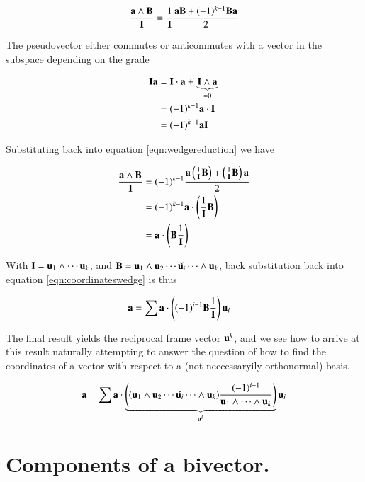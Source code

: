 \documentclass{article}      %
\begin{document}
\begin{equation}\label{eqn:wedgereduction}
\frac{\mathbf{a} \wedge \mathbf{B}}{\mathbf{I}} = \frac{1}{\mathbf{I}} \frac{\mathbf{a}\mathbf{B} + (-1)^{k-1}\mathbf{B}\mathbf{a}}{2}
\end{equation}

The pseudovector either commutes or anticommutes with a vector in the subspace depending on the grade

\begin{align*}
\mathbf{I} \mathbf{a} 
&= \mathbf{I} \cdot \mathbf{a} + \underbrace{\mathbf{I} \wedge \mathbf{a}}_{=0} \\
&= (-1)^{k-1}\mathbf{a} \cdot \mathbf{I} \\
&= (-1)^{k-1}\mathbf{a} \mathbf{I} \\
\end{align*}

Substituting back into equation \ref{eqn:wedgereduction} we have

\begin{align*}
\frac{\mathbf{a} \wedge \mathbf{B}}{\mathbf{I}}
&= (-1)^{k-1} \frac{\mathbf{a} \left(\frac{1}{\mathbf{I}}\mathbf{B}\right) + \left(\frac{1}{\mathbf{I}}\mathbf{B}\right)\mathbf{a}}{2} \\
&= (-1)^{k-1} \mathbf{a} \cdot \left(\frac{1}{\mathbf{I}}\mathbf{B}\right) \\
&= \mathbf{a} \cdot \left(\mathbf{B} \frac{1}{\mathbf{I}}\right) \\
\end{align*}

With $\mathbf{I} = \mathbf{u}_1 \wedge \cdots \mathbf{u}_k$, and $\mathbf{B} = \mathbf{u}_1 \wedge \mathbf{u}_2 \cdots \check{\mathbf{u}_i} \cdots \wedge \mathbf{u}_k$,
back substitution back into equation \ref{eqn:coordinateswedge} is thus

\begin{align*}
\mathbf{a} 
&= \sum
\mathbf{a} \cdot \left(
(-1)^{i-1} 
\mathbf{B} \frac{1}{\mathbf{I}}\right) \mathbf{u}_i
\end{align*}

The final result yields the reciprocal frame vector $\mathbf{u}^k$, and we see how to arrive at this result naturally attempting
to answer the question of how to find the coordinates of a vector with respect to a (not neccessaryily orthonormal) basis.

\begin{equation}\label{eqn:recipdot}
\mathbf{a} =
\sum
\mathbf{a} \cdot 
\underbrace{
\left((\mathbf{u}_1 \wedge \mathbf{u}_2 \cdots \check{\mathbf{u}_i} \cdots \wedge \mathbf{u}_k) \frac{ (-1)^{i-1} }{ \mathbf{u}_1 \wedge \cdots \wedge \mathbf{u}_k }\right) 
}_{\mathbf{u}^k}
\mathbf{u}_i
\end{equation}

\section{ Components of a bivector. }
\end{document}
